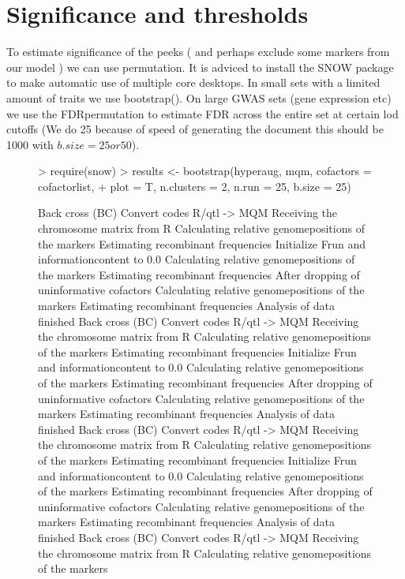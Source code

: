 \documentclass[11pt]{article}
\begin{document}
\section{Significance and thresholds}
To estimate significance of the peeks ( and perhaps exclude some markers from our model ) we can use permutation. It is adviced to install the SNOW package \cite{tierney03}\cite{tierney04} to make automatic use of multiple core desktops. In small sets with a limited amount of traits we use bootstrap(). On large GWAS sets (gene expression etc) we use the FDRpermutation to estimate FDR across the entire set at certain lod cutoffs (We do 25 because of speed of generating the document this should be 1000 with $b.size=25 or 50$).
\begin{figure}[ht]
\begin{Schunk}
\begin{Sinput}
> require(snow)
> results <- bootstrap(hyperaug, mqm, cofactors = cofactorlist, 
+     plot = T, n.clusters = 2, n.run = 25, b.size = 25)
\end{Sinput}
\begin{Soutput}
Back cross (BC)
Convert codes R/qtl -> MQM
Receiving the chromosome matrix from R
Calculating relative genomepositions of the markers
Estimating recombinant frequencies
Initialize Frun and informationcontent to 0.0
Calculating relative genomepositions of the markers
Estimating recombinant frequencies
After dropping of uninformative cofactors
Calculating relative genomepositions of the markers
Estimating recombinant frequencies
Analysis of data finished
Back cross (BC)
Convert codes R/qtl -> MQM
Receiving the chromosome matrix from R
Calculating relative genomepositions of the markers
Estimating recombinant frequencies
Initialize Frun and informationcontent to 0.0
Calculating relative genomepositions of the markers
Estimating recombinant frequencies
After dropping of uninformative cofactors
Calculating relative genomepositions of the markers
Estimating recombinant frequencies
Analysis of data finished
Back cross (BC)
Convert codes R/qtl -> MQM
Receiving the chromosome matrix from R
Calculating relative genomepositions of the markers
Estimating recombinant frequencies
Initialize Frun and informationcontent to 0.0
Calculating relative genomepositions of the markers
Estimating recombinant frequencies
After dropping of uninformative cofactors
Calculating relative genomepositions of the markers
Estimating recombinant frequencies
Analysis of data finished
Back cross (BC)
Convert codes R/qtl -> MQM
Receiving the chromosome matrix from R
Calculating relative genomepositions of the markers

\end{Soutput}
\end{Schunk}
\end{figure}
\end{document}
